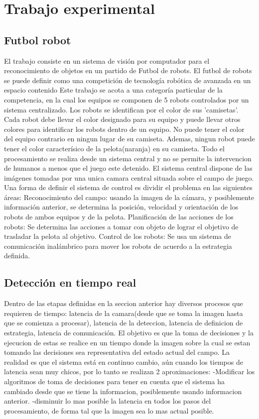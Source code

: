 \documentclass[a4paper,10pt]{report}
\begin{document}
\chapter{Trabajo experimental}
\section{Futbol robot}
El trabajo consiste en un sistema de visión por computador para el reconocimiento de objetos en un partido de Futbol de robots.
El futbol de robots se puede definir como una competición de tecnología robótica de avanzada en un espacio contenido
Este trabajo se acota a una categoría particular de la competencia, en la cual los equipos se componen de 5 robots controlados por un sistema centralizado. 
Los robots se identifican por el color de sus 'camisetas'. Cada robot debe llevar el color designado para su equipo y puede llevar otros colores para identificar los robots dentro de un equipo.
No puede tener el color del equipo contrario en ningun lugar de su camiseta.
Ademas, ningun robot puede tener el color caracterísico de la pelota(naranja) en su camiseta.
Todo el procesamiento se realiza desde un sistema central y no se permite la intervencion de humanos a menos que el juego este detenido.
El sistema central dispone de las imágenes tomadas por una unica camara central situada sobre el campo de juego.
Una forma de definir el sistema de control es dividir el problema en las siguientes áreas:
Reconocimiento del campo: usando la imagen de la cámara, y posiblemente información anterior, se determina la posición, velocidad y orientación de los robots de ambos equipos y de la pelota.
Planificación de las acciones de los robots: Se determina las acciones a tomar con objeto de lograr el objetivo de trasladar la pelota al objetivo.
Control de los robots: Se usa un sistema de comunicación inalámbrico para mover los robots de acuerdo a la estrategia definida.


\section{Detección en tiempo real}
Dentro de las etapas definidas en la seccion anterior hay diversos procesos que requieren de tiempo: latencia de la camara(desde que se toma la imagen hasta que se comienza a procesar),
latencia de la deteccion, latencia de definicion de estrategia, latencia de comunicación.
El objetivo es que la toma de decisiones y la ejecucion de estas se realice en un tiempo donde la imagen sobre la cual se estan tomando las decisiones sea representativa del estado actual del campo.
La realidad es que el sistema está en continuo cambio, aún cuando los tiempos de latencia sean muy chicos, por lo tanto se realizan 2 aproximaciones: 
-Modificar los algoritmos de toma de decisiones para tener en cuenta que el sistema ha cambiado desde que se tiene la informacion, posiblemente usando informacion anterior.
-disminuir lo mas posible la latencia en todos los pasos del procesamiento, de forma tal que la imagen sea lo mas actual posible.
\end{document}
